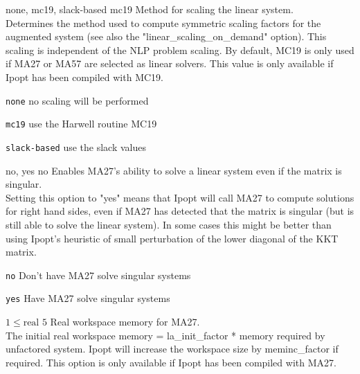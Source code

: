 %
{\ttfamily none, mc19, slack-based}%
{mc19}%
{Method for scaling the linear system.\\
Determines the method used to compute symmetric scaling factors for the augmented system (see also the "linear\_scaling\_on\_demand" option).  This scaling is independent of the NLP problem scaling.  By default, MC19 is only used if MA27 or MA57 are selected as linear solvers. This value is only available if Ipopt has been compiled with MC19.}%
{\begin{list}{}{
\setlength{\parsep}{0em}
\setlength{\leftmargin}{5ex}
\setlength{\labelwidth}{2ex}
\setlength{\itemindent}{0ex}
\setlength{\topsep}{0pt}}
\item[\texttt{none}] no scaling will be performed
\item[\texttt{mc19}] use the Harwell routine MC19
\item[\texttt{slack-based}] use the slack values
\end{list}
}


%
{\ttfamily no, yes}%
{no}%
{Enables MA27's ability to solve a linear system even if the matrix is singular.\\
Setting this option to "yes" means that Ipopt will call MA27 to compute solutions for right hand sides, even if MA27 has detected that the matrix is singular (but is still able to solve the linear system). In some cases this might be better than using Ipopt's heuristic of small perturbation of the lower diagonal of the KKT matrix.}%
{\begin{list}{}{
\setlength{\parsep}{0em}
\setlength{\leftmargin}{5ex}
\setlength{\labelwidth}{2ex}
\setlength{\itemindent}{0ex}
\setlength{\topsep}{0pt}}
\item[\texttt{no}] Don't have MA27 solve singular systems
\item[\texttt{yes}] Have MA27 solve singular systems
\end{list}
}

%
{$1\leq\textrm{real}$}%
{$5$}%
{Real workspace memory for MA27.\\
The initial real workspace memory = la\_init\_factor * memory required by unfactored system. Ipopt will increase the workspace size by meminc\_factor if required.  This option is only available if  Ipopt has been compiled with MA27.}%
{}

